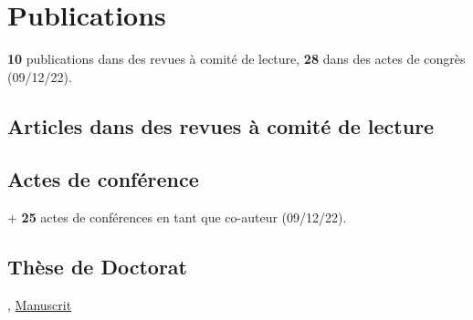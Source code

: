 \section{Publications}
\textbf{10} publications dans des revues à comité de lecture, \textbf{28} dans des actes de congrès (09/12/22).

\subsection{Articles dans des revues à comité de lecture}

\tabitem {}

\tabitem {}

\tabitem {}

\tabitem {}

\tabitem {}

\tabitem {}

\tabitem {}

\tabitem {}

\tabitem {}

\tabitem {}

\subsection{Actes de conférence}
\tabitem {}

\tabitem {}

\tabitem {}

$+$ \textbf{25} actes de conférences en tant que co-auteur (09/12/22).

\subsection{Thèse de Doctorat}
, \href{https://raw.githubusercontent.com/fkeruzore/PhDThesis-public/main/manuscrit.pdf}{Manuscrit}
